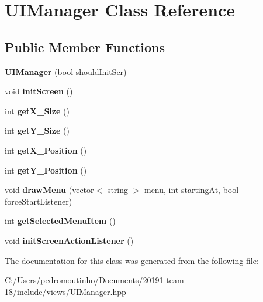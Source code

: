 \hypertarget{class_u_i_manager}{}\section{U\+I\+Manager Class Reference}
\label{class_u_i_manager}
\subsection*{Public Member Functions}
\begin{DoxyCompactItemize}
\item 
\mbox{\label{class_u_i_manager_a90921f00ec8b5b10c571173e8d183fb9}} 
{\bfseries U\+I\+Manager} (bool should\+Init\+Scr)
\item 
\mbox{\label{class_u_i_manager_a263527005952f257540fb88ad90520bd}} 
void {\bfseries init\+Screen} ()
\item 
\mbox{\label{class_u_i_manager_ad28df39a77eecb7a593815b648cffdae}} 
int {\bfseries get\+X\+\_\+\+Size} ()
\item 
\mbox{\label{class_u_i_manager_af82b5651661b605f0b7479e261682df5}} 
int {\bfseries get\+Y\+\_\+\+Size} ()
\item 
\mbox{\label{class_u_i_manager_ab605a6072f156ef96d913050fa1d6949}} 
int {\bfseries get\+X\+\_\+\+Position} ()
\item 
\mbox{\label{class_u_i_manager_a98d63d518a4f9e3b516fd08d780836c7}} 
int {\bfseries get\+Y\+\_\+\+Position} ()
\item 
\mbox{\label{class_u_i_manager_a516d1b113b99156e491018048cb4d247}} 
void {\bfseries draw\+Menu} (vector$<$ string $>$ menu, int starting\+At, bool force\+Start\+Listener)
\item 
\mbox{\label{class_u_i_manager_a8008637d2709dbed41f0cc897f207a6c}} 
int {\bfseries get\+Selected\+Menu\+Item} ()
\item 
\mbox{\label{class_u_i_manager_af299dbeade74ae92b8aaa63cba52860d}} 
void {\bfseries init\+Screen\+Action\+Listener} ()
\end{DoxyCompactItemize}


The documentation for this class was generated from the following file\+:\begin{DoxyCompactItemize}
\item 
C\+:/\+Users/pedromoutinho/\+Documents/20191-\/team-\/18/include/views/U\+I\+Manager.\+hpp\end{DoxyCompactItemize}
